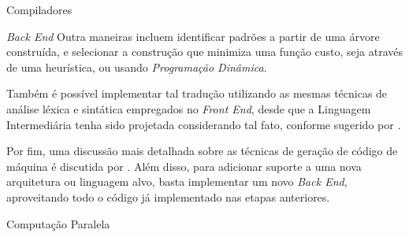 \begin{section}{Compiladores}
\begin{subsection}{\textit{Back End}}
    Outra maneiras incluem identificar padrões a partir de uma árvore
construída, e selecionar a construção que minimiza uma função custo, seja através de uma
heurística, ou usando \textit{Programação Dinâmica}. 

	Também é possível implementar tal tradução utilizando as mesmas técnicas de
análise léxica e sintática empregados no \textit{Front End}, desde que a
Linguagem Intermediária tenha sido projetada considerando tal fato, conforme
sugerido por \cite{glanville1978}. 

Por fim, uma discussão mais detalhada sobre
as técnicas de geração de código de máquina é discutida por
\citep{blindell2016instruction}. Além disso, para 
 adicionar suporte a uma nova arquitetura ou linguagem
alvo, basta implementar um novo \textit{Back End}, aproveitando todo
o código já implementado nas etapas anteriores.
\end{subsection}


\end{section}

\begin{section}{Computação Paralela}

\end{section}



